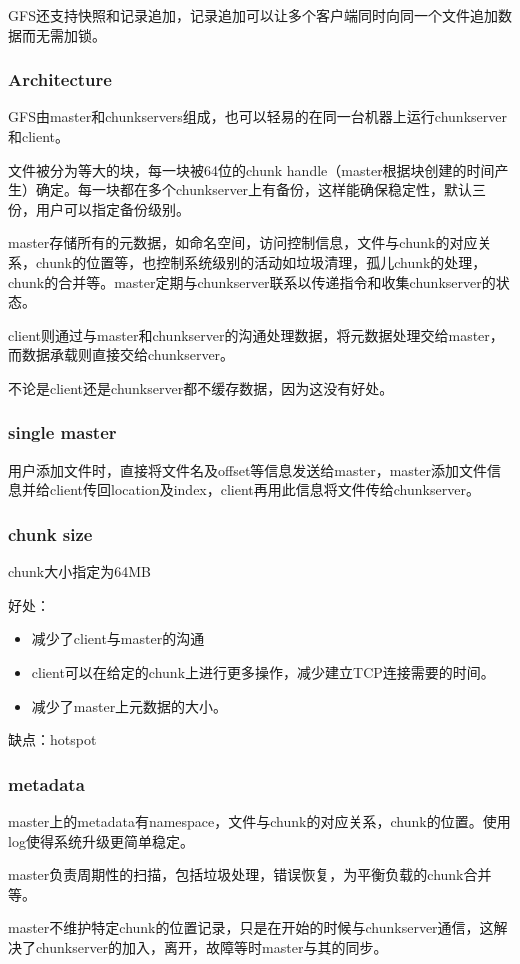 \documentclass{ctexart}
\begin{document}
GFS还支持快照和记录追加，记录追加可以让多个客户端同时向同一个文件追加数据而无需加锁。
\subsubsection{Architecture}
GFS由master和chunkservers组成，也可以轻易的在同一台机器上运行chunkserver和client。

文件被分为等大的块，每一块被64位的chunk handle（master根据块创建的时间产生）确定。每一块都在多个chunkserver上有备份，这样能确保稳定性，默认三份，用户可以指定备份级别。

master存储所有的元数据，如命名空间，访问控制信息，文件与chunk的对应关系，chunk的位置等，也控制系统级别的活动如垃圾清理，孤儿chunk的处理，chunk的合并等。master定期与chunkserver联系以传递指令和收集chunkserver的状态。

client则通过与master和chunkserver的沟通处理数据，将元数据处理交给master，而数据承载则直接交给chunkserver。

不论是client还是chunkserver都不缓存数据，因为这没有好处。
\subsubsection{single master}
用户添加文件时，直接将文件名及offset等信息发送给master，master添加文件信息并给client传回location及index，client再用此信息将文件传给chunkserver。
\subsubsection{chunk size}
chunk大小指定为64MB

好处：
\begin{itemize}
	\item 减少了client与master的沟通
	\item client可以在给定的chunk上进行更多操作，减少建立TCP连接需要的时间。
	\item 减少了master上元数据的大小。
\end{itemize}

缺点：hotspot
\subsubsection{metadata}
master上的metadata有namespace，文件与chunk的对应关系，chunk的位置。使用log使得系统升级更简单稳定。

master负责周期性的扫描，包括垃圾处理，错误恢复，为平衡负载的chunk合并等。

master不维护特定chunk的位置记录，只是在开始的时候与chunkserver通信，这解决了chunkserver的加入，离开，故障等时master与其的同步。
\end{document}
